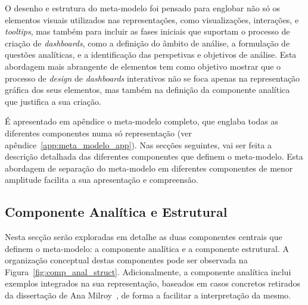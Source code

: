 O desenho e estrutura do meta-modelo foi pensado para englobar não só os elementos visuais utilizados nas representações, como visualizações, interações, e \textit{tooltips}, mas também para incluir as fases iniciais que suportam o processo de criação de \textit{dashboards}, como a definição do âmbito de análise, a formulação de questões analíticas, e a identificação das perspetivas e objetivos de análise. Esta abordagem mais abrangente de elementos tem como objetivo mostrar que o processo de \textit{design} de \textit{dashboards} interativos não se foca apenas na representação gráfica dos seus elementos, mas também na definição da componente analítica que justifica a sua criação.

É apresentado em apêndice o meta-modelo completo, que englaba todas as diferentes componentes numa só representação (ver apêndice~\ref{app:meta_modelo_app}). Nas secções seguintes, vai ser feita a descrição detalhada das diferentes componentes que definem o meta-modelo. Esta abordagem de separação do meta-modelo em diferentes componentes de menor amplitude facilita a sua apresentação e compreensão.

\subsection{Componente Analítica e Estrutural} %
\label{sub:anal_struct_comp}

Nesta secção serão exploradas em detalhe as duas componentes centrais que definem o meta-modelo: a componente analítica e a componente estrutural. A organização conceptual destas componentes pode ser observada na Figura~\ref{fig:comp_anal_struct}. Adicionalmente, a componente analítica inclui exemplos integrados na sua representação, baseados em casos concretos retirados da dissertação de Ana Milroy~\cite{milroy2025}, de forma a facilitar a interpretação da mesmo.

